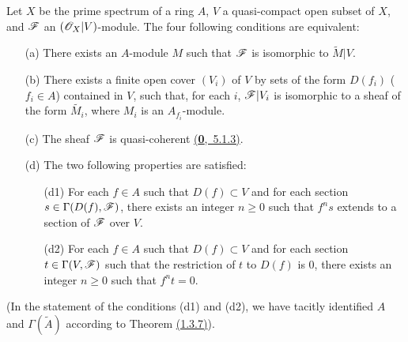\begin{thm}[1.4.1]
\label{thm-1.1.4.1}
Let $X$ be the prime spectrum of a ring $A$, $V$ a quasi-compact open subset of $X$, and
$\mathscr{F}$ an $(\mathscr{O}_X|V)$-module. The four following conditions are equivalent:
\begin{itemize}
  \item[{\rm(a)}] There exists an $A$-module $M$ such that $\mathscr{F}$ is isomorphic to $\widetilde{M}|V$.
  \item[{\rm(b)}] There exists a finite open cover $(V_i)$ of $V$ by sets of the form $D(f_i)$
    ($f_i\in A$) contained in $V$, such that, for each $i$, $\mathscr{F}|V_i$ is isomorphic to
    a sheaf of the form $\widetilde{M_i}$, where $M_i$ is an $A_{f_i}$-module.
  \item[{\rm(c)}] The sheaf $\mathscr{F}$ is quasi-coherent \hyperref[env-0.5.1.3]{(\textbf{0},~5.1.3)}.
  \item[{\rm(d)}] The two following properties are satisfied:
    \begin{itemize}
      \item[{\rm(d1)}] For each $f\in A$ such that $D(f)\subset V$ and for each section
        $s\in\Gamma(D(f),\mathscr{F})$, there exists an integer $n\geqslant 0$ such that
        $f^n s$ extends to a section of $\mathscr{F}$ over $V$.
      \item[{\rm(d2)}] For each $f\in A$ such that $D(f)\subset V$ and for each section
        $t\in\Gamma(V,\mathscr{F})$ such that the restriction of $t$ to $D(f)$ is $0$,
        there exists an integer $n\geqslant 0$ such that $f^n t=0$.
    \end{itemize}
\end{itemize}
\end{thm}
(In the statement of the conditions (d1) and (d2), we have tacitly identified $A$ and
$\Gamma(\widetilde{A})$ according to Theorem \hyperref[thm-1.1.3.7]{(1.3.7)}).

